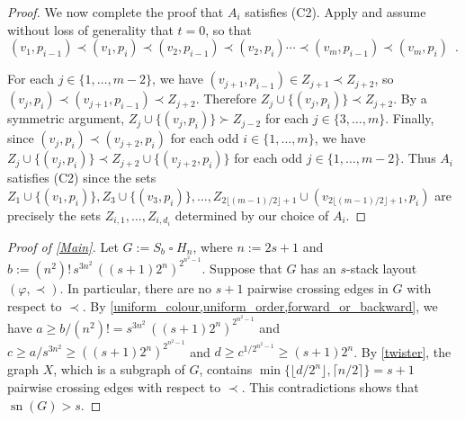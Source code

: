 \documentclass[kpfonts]{patmorin}
\DeclareMathOperator{\sn}{sn}
\renewcommand{\ge}{\geqslant}
\renewcommand{\geq}{\geqslant}
\newcommand{\CartProd}{\mathbin{\square}}
\begin{document}
\begin{proof}
We now complete the proof that $A_i$ satisfies (C2). Apply  and assume without loss of generality that $t=0$, so that
	\[
		(v_1,p_{i-1})\prec (v_1,p_{i}) \prec (v_2,p_{i-1}) \prec (v_2,p_{i}) \cdots \prec (v_m,p_{i-1}) \prec (v_m,p_{i}) \enspace .
	\]

    For each $j\in\{1,\ldots,m-2\}$, we have $(v_{j+1},p_{i-1})\in Z_{j+1}\prec Z_{j+2}$, so  $(v_j,p_i)\prec (v_{j+1},p_{i-1}) \prec Z_{j+2}$.  Therefore $Z_j\cup\{(v_j,p_i)\} \prec Z_{j+2}$.  By a symmetric argument, $Z_j\cup\{(v_j,p_i)\} \succ Z_{j-2}$ for each  $j\in\{3,\ldots,m\}$.  Finally, since $(v_{j},p_i)\prec (v_{j+2},p_i)$ for each odd $i\in\{1,\ldots,m\}$, we have $Z_{j}\cup\{(v_j,p_i)\} \prec Z_{j+2}\cup\{(v_{j+2},p_i)\}$ for each odd $j\in\{1,\ldots,m-2\}$.  Thus $A_i$ satisfies (C2) since the sets $Z_1\cup\{(v_1,p_i)\},Z_3\cup\{(v_3,p_i)\},\ldots,Z_{2\lfloor (m-1)/2\rfloor+1} \cup (v_{2\lfloor (m-1)/2\rfloor+1},p_i)$ are precisely the sets $Z_{i,1},\ldots,Z_{i,d_i}$ determined by our choice of $A_i$.
\end{proof}

%
%

\begin{proof}[Proof of \cref{Main}]
Let $G := S_b \CartProd H_n$, where $n :=2s+1$ and $b := (n^2)!\, s^{3n^2}\, ((s+1)2^n)^{2^{n^2-1}} $. Suppose that $G$ has an $s$-stack layout  $(\varphi,\prec)$. In particular, there are no $s+1$ pairwise crossing edges in $G$ with respect to $\prec$. By \cref{uniform_colour,uniform_order,forward_or_backward}, we have $a\ge b/(n^2)! = s^{3n^2}\, ((s+1)2^n)^{2^{n^2-1}}$ and $c\ge a/s^{3n^2} \geq ((s+1)2^n)^{2^{n^2-1}}$ and
$d\ge c^{1/2^{n^2-1}} \ge (s+1)2^n$. By \cref{twister}, the graph $X$, which is a subgraph of $G$, contains $\min\{\lfloor d/2^{n}\rfloor,\lceil n/2\rceil\}=s+1$ pairwise crossing edges with respect to $\prec$. This contradictions shows that $\sn(G)> s$.
\end{proof}
\end{document}
